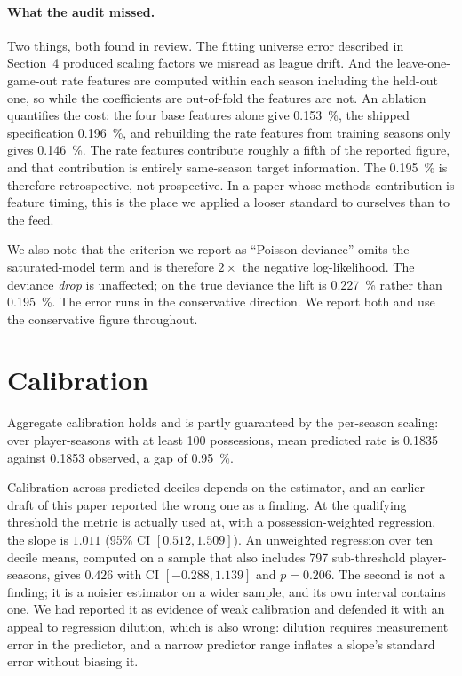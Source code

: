 \documentclass[11pt,letterpaper]{article}
\begin{document}
\paragraph{What the audit missed.} Two things, both found in review. The fitting
universe error described in Section~4 produced scaling factors we misread as
league drift. And the leave-one-game-out rate features are computed within each
season including the held-out one, so while the coefficients are out-of-fold the
features are not. An ablation quantifies the cost: the four base features alone
give \SI{0.153}{\percent}, the shipped specification \SI{0.196}{\percent}, and
rebuilding the rate features from training seasons only gives
\SI{0.146}{\percent}. The rate features contribute roughly a fifth of the reported
figure, and that contribution is entirely same-season target information. The
\SI{0.195}{\percent} is therefore retrospective, not prospective. In a paper whose
methods contribution is feature timing, this is the place we applied a looser
standard to ourselves than to the feed.

We also note that the criterion we report as ``Poisson deviance'' omits the
saturated-model term and is therefore $2\times$ the negative log-likelihood. The
deviance \emph{drop} is unaffected; on the true deviance the lift is
\SI{0.227}{\percent} rather than \SI{0.195}{\percent}. The error runs in the
conservative direction. We report both and use the conservative figure throughout.

\section{Calibration}
\label{sec:calibration}

Aggregate calibration holds and is partly guaranteed by the per-season scaling:
over player-seasons with at least 100 possessions, mean predicted rate is 0.1835
against 0.1853 observed, a gap of \SI{0.95}{\percent}.

Calibration across predicted deciles depends on the estimator, and an earlier
draft of this paper reported the wrong one as a finding. At the qualifying
threshold the metric is actually used at, with a possession-weighted regression,
the slope is $1.011$ (95\% CI $[0.512, 1.509]$). An unweighted regression over ten
decile means, computed on a sample that also includes 797 sub-threshold
player-seasons, gives $0.426$ with CI $[-0.288, 1.139]$ and $p = 0.206$. The
second is not a finding; it is a noisier estimator on a wider sample, and its own
interval contains one. We had reported it as evidence of weak calibration and
defended it with an appeal to regression dilution, which is also wrong: dilution
requires measurement error in the predictor, and a narrow predictor range inflates
a slope's standard error without biasing it.
\end{document}
